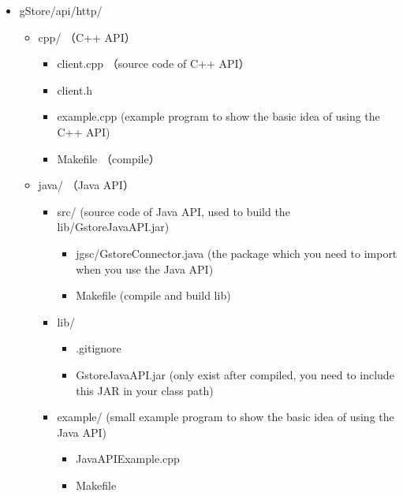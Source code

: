 \documentclass[titlepage, a4paper, 12pt]{article}
\begin{document}
\begin{itemize}
	\item
	gStore/api/http/
	
	\begin{itemize}
		\item
		cpp/ （C++ API）
		
		\begin{itemize}
			\item
			client.cpp （source code of C++ API）
			\item 
			client.h
			\item 
			example.cpp (example program to show the basic idea of using the C++ API)
			\item 
			Makefile （compile）
			
		\end{itemize}
		
		\item
		java/ （Java API）
		\begin{itemize}
			\item
			src/ (source code of Java API, used to build the
			lib/GstoreJavaAPI.jar)
			
			\begin{itemize}
				\item
				jgsc/GstoreConnector.java (the package which you need to import when you use the Java API)
				\item
				Makefile (compile and build lib)
			\end{itemize}
			\item
			lib/
			
			\begin{itemize}
				\item
				.gitignore
				\item
				GstoreJavaAPI.jar (only exist after compiled, you need to
				include this JAR in your class path)
			\end{itemize}
			\item
			example/ (small example program to show the basic idea of using
			the Java API)
			
			\begin{itemize}
				\item
				JavaAPIExample.cpp
				\item
				Makefile
			\end{itemize}
		\end{itemize}
		
	\end{itemize}
\end{itemize}
\end{document}
